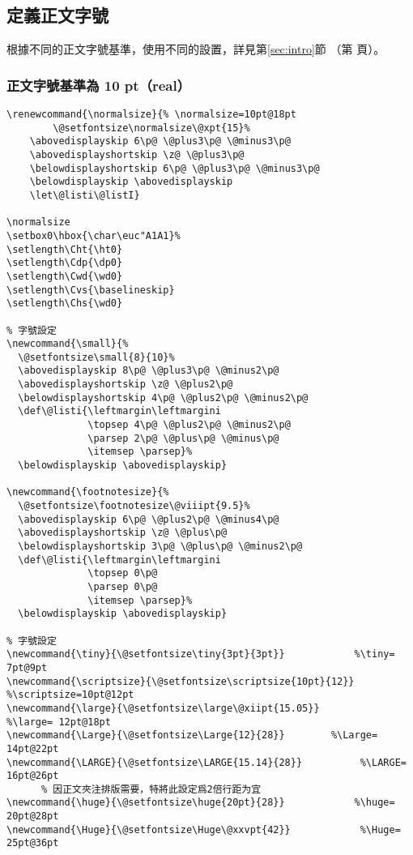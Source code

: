\subsection{定義正文字號}


\par%
根據不同的正文字號基準，使用不同的設置，詳見第\ref{sec:intro}節
（第\pageref{sec:intro} 頁）。

\subsubsection{正文字號基準為 10 pt（real）}

\begin{lstlisting}[firstnumber=128]
\renewcommand{\normalsize}{% \normalsize=10pt@18pt
        \@setfontsize\normalsize\@xpt{15}%
    \abovedisplayskip 6\p@ \@plus3\p@ \@minus3\p@
    \abovedisplayshortskip \z@ \@plus3\p@
    \belowdisplayshortskip 6\p@ \@plus3\p@ \@minus3\p@
    \belowdisplayskip \abovedisplayskip
    \let\@listi\@listI}

\normalsize
\setbox0\hbox{\char\euc"A1A1}%
\setlength\Cht{\ht0}
\setlength\Cdp{\dp0}
\setlength\Cwd{\wd0}
\setlength\Cvs{\baselineskip}
\setlength\Chs{\wd0}

% 字號設定
\newcommand{\small}{%
  \@setfontsize\small{8}{10}%
  \abovedisplayskip 8\p@ \@plus3\p@ \@minus2\p@
  \abovedisplayshortskip \z@ \@plus2\p@
  \belowdisplayshortskip 4\p@ \@plus2\p@ \@minus2\p@
  \def\@listi{\leftmargin\leftmargini
              \topsep 4\p@ \@plus2\p@ \@minus2\p@
              \parsep 2\p@ \@plus\p@ \@minus\p@
              \itemsep \parsep}%
  \belowdisplayskip \abovedisplayskip}

\newcommand{\footnotesize}{%
  \@setfontsize\footnotesize\@viiipt{9.5}%
  \abovedisplayskip 6\p@ \@plus2\p@ \@minus4\p@
  \abovedisplayshortskip \z@ \@plus\p@
  \belowdisplayshortskip 3\p@ \@plus\p@ \@minus2\p@
  \def\@listi{\leftmargin\leftmargini
              \topsep 0\p@
              \parsep 0\p@
              \itemsep \parsep}%
  \belowdisplayskip \abovedisplayskip}

% 字號設定
\newcommand{\tiny}{\@setfontsize\tiny{3pt}{3pt}}            %\tiny= 7pt@9pt
\newcommand{\scriptsize}{\@setfontsize\scriptsize{10pt}{12}}    %\scriptsize=10pt@12pt
\newcommand{\large}{\@setfontsize\large\@xiipt{15.05}}         %\large= 12pt@18pt
\newcommand{\Large}{\@setfontsize\Large{12}{28}}        %\Large= 14pt@22pt
\newcommand{\LARGE}{\@setfontsize\LARGE{15.14}{28}}          %\LARGE= 16pt@26pt
      % 因正文夾注排版需要，特將此設定爲2倍行距为宜
\newcommand{\huge}{\@setfontsize\huge{20pt}{28}}            %\huge= 20pt@28pt
\newcommand{\Huge}{\@setfontsize\Huge\@xxvpt{42}}            %\Huge= 25pt@36pt
\end{lstlisting}

